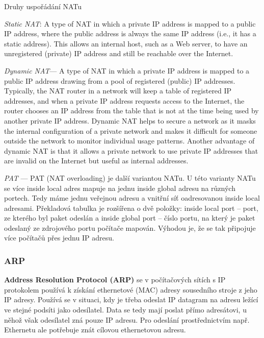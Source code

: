 \begin{obecne}{Druhy uspořádání NATu}
\begin{pitemize}
\item \emph{Static NAT}: A type of NAT in which a private IP address is mapped to a public IP address, where the public address is always the same IP address (i.e., it has a static address). This allows an internal host, such as a Web server, to have an unregistered (private) IP address and still be reachable over the Internet.

\item \emph{Dynamic NAT}--- A type of NAT in which a private IP address is mapped to a public IP address drawing from a pool of registered (public) IP addresses. Typically, the NAT router in a network will keep a table of registered IP addresses, and when a private IP address requests access to the Internet, the router chooses an IP address from the table that is not at the time being used by another private IP address. Dynamic NAT helps to secure a network as it masks the internal configuration of a private network and makes it difficult for someone outside the network to monitor individual usage patterns. Another advantage of dynamic NAT is that it allows a private network to use private IP addresses that are invalid on the Internet but useful as internal addresses.

\item \emph{PAT} --- PAT (NAT overloading) je další variantou NATu. U této varianty NATu se více inside local adres mapuje na jednu inside global adresu na různých portech. Tedy máme jednu veřejnou adresu a vnitřní síť oadresovanou inside local adresami. 
Překladová tabulka je rozšířena o dvě položky: inside local port -- port, ze kterého byl paket odeslán a inside global port -- číslo portu, na který je paket odeslaný ze zdrojového portu počítače mapován. Výhodou je, že se tak připojuje více počítačů přes jednu IP adresu.
\end{pitemize}
\end{obecne}


\subsubsection*{ARP}

\textbf{Address Resolution Protocol (ARP)} se v počítačových sítích s IP protokolem používá k získání ethernetové (MAC) adresy sousedního stroje z jeho IP adresy. Používá se v situaci, kdy je třeba odeslat IP datagram na adresu ležící ve stejné podsíti jako odesílatel. Data se tedy mají poslat přímo adresátovi, u něhož však odesílatel zná pouze IP adresu. Pro odeslání prostřednictvím např. Ethernetu ale potřebuje znát cílovou ethernetovou adresu.

